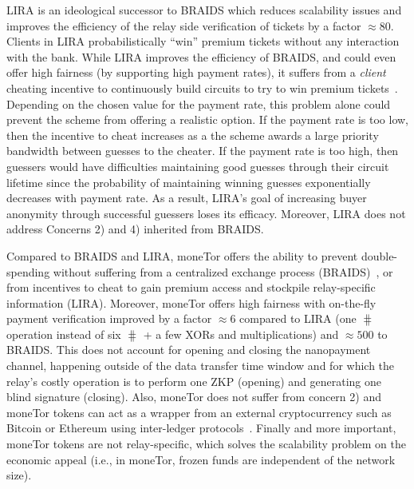 LIRA is an ideological successor to BRAIDS which reduces scalability issues and
improves the efficiency of the relay side verification of tickets by a factor
$\approx 80$. Clients in LIRA probabilistically ``win'' premium tickets without
any interaction with the bank. While LIRA improves the efficiency of BRAIDS, and
could even offer high fairness (by supporting high payment rates), it suffers
from a \textit{client} cheating incentive to continuously build circuits to try
to win premium tickets~\cite{jansen2013lira, jansenblogpost}. Depending on the
chosen value for the payment rate, this problem alone could prevent the scheme
from offering a realistic option. If the payment rate is too low, then the
incentive to cheat increases as a the scheme awards a large priority bandwidth
between guesses to the cheater. If the payment rate is too high, then guessers
would have difficulties maintaining good guesses through their circuit lifetime
since the probability of maintaining winning guesses exponentially decreases
with payment rate. As a result, LIRA's goal of increasing buyer anonymity
through successful guessers loses its efficacy. Moreover, LIRA does not
address Concerns 2) and 4) inherited from BRAIDS.

Compared to BRAIDS and LIRA, moneTor offers the ability to prevent
double-spending without suffering from a centralized exchange process
(BRAIDS)~\cite{jansenblogpost}, or from incentives to cheat to gain premium
access and stockpile relay-specific information (LIRA). Moreover, moneTor offers
high fairness with on-the-fly payment verification improved by a factor $\approx
6$ compared to LIRA (one $\hash$ operation instead of six $\hash$ + a few XORs
and multiplications) and $\approx 500$ to BRAIDS. This does not account for
opening and closing the nanopayment channel, happening outside of the data
transfer time window and for which the relay's costly operation is to perform
one ZKP (opening) and generating one blind signature (closing). Also, moneTor
does not suffer from concern 2) and moneTor tokens can act as a wrapper from an
external cryptocurrency such as Bitcoin or Ethereum using inter-ledger
protocols~\cite{back2014enabling, poon2017plasma}.
  Finally and more important, moneTor tokens are not relay-specific, which
  solves the scalability problem on the economic appeal (i.e., in moneTor,
  frozen funds are independent of the network size).

